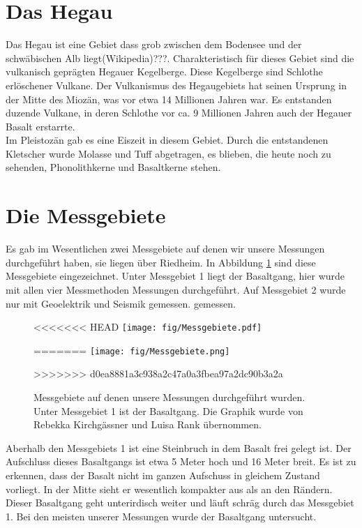 
\section{Das Hegau}
Das Hegau ist eine Gebiet dass grob zwischen dem Bodensee und der schwäbischen Alb liegt(Wikipedia)???. Charakteristisch für dieses Gebiet sind die vulkanisch 
geprägten Hegauer Kegelberge. Diese Kegelberge sind Schlothe erlöschener Vulkane. Der Vulkanismus des Hegaugebiets hat seinen Ursprung in der Mitte des Miozän, 
was vor etwa 14 Millionen Jahren war. Es entstanden duzende Vulkane, in deren Schlothe vor ca. 9 Millionen Jahren auch der Hegauer Basalt erstarrte.\\
Im Pleistozän gab es eine Eiszeit in diesem Gebiet. Durch die entstandenen Kletscher wurde Molasse und Tuff abgetragen, es blieben, die heute noch zu sehenden, 
Phonolithkerne und Basaltkerne stehen. 



\newpage


\section{Die Messgebiete}


Es gab im Wesentlichen zwei Messgebiete auf denen wir unsere Messungen durchgeführt haben, sie liegen über Riedheim. In Abbildung \ref{abb:Messgebiete} sind diese Messgebiete 
eingezeichnet. Unter Messgebiet 1 liegt der Basaltgang, hier wurde mit allen vier Messmethoden Messungen durchgeführt. 
Auf Messgebiet 2 wurde nur mit Geoelektrik und Seismik gemessen.
gemessen.
\begin{figure}[h]
 \centering
<<<<<<< HEAD
 \texttt{[image: fig/Messgebiete.pdf]}
 \caption[Messgebiete]{Messgebiete auf denen unsere Messungen durchgeführt wurden. Unter Messgebiet 1 ist der Basaltgang.}
=======
 \texttt{[image: fig/Messgebiete.png]}
 \caption[Messgebiete]{Messgebiete auf denen unsere Messungen durchgeführt wurden. Unter Messgebiet 1 ist der Basaltgang. Die Graphik wurde von Rebekka Kirchgässner und Luisa Rank übernommen.}
>>>>>>> d0ea8881a3c938a2c47a0a3fbea97a2dc90b3a2a
 \label{abb:Messgebiete}
\end{figure}

Aberhalb den Messgebiets 1 ist eine Steinbruch in dem Basalt frei gelegt ist. Der Aufschluss dieses Basaltgangs ist etwa 5 Meter hoch und 16 Meter breit. 
Es ist zu erkennen, dass der Basalt nicht im ganzen Aufschuss in gleichem Zustand vorliegt. In der Mitte sieht er wesentlich kompakter aus als an den Rändern.
Dieser Basaltgang geht unterirdisch weiter und läuft schräg durch das Messgebiet 1. Bei den meisten unserer Messungen wurde der Basaltgang untersucht.

